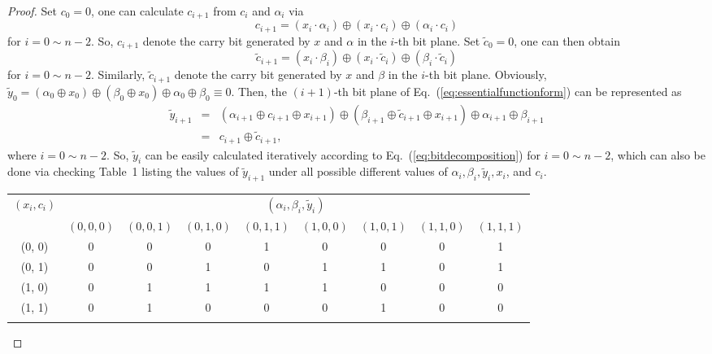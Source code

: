 \documentclass{ws-ijbc}
\begin{document}
\begin{proof}
Set $c_0=0$, one can calculate
$c_{i+1}$ from $c_i$ and $\alpha_i$ via
\begin{equation}
c_{i+1}=(x_i\cdot \alpha_i) \oplus (x_i\cdot c_i) \oplus (\alpha_i\cdot c_i)
\label{eq:getcarrybit}
\end{equation}
for $i=0\sim n-2$. So, $c_{i+1}$ denote the carry bit generated by $x$ and $\alpha$ in the $i$-th bit plane. Set $\tilde{c}_0=0$, one can then obtain
\begin{equation*}
\tilde{c}_{i+1}=(x_i\cdot \beta_i) \oplus (x_i\cdot \tilde{c}_i) \oplus (\beta_i\cdot \tilde{c}_i)
\end{equation*}
for $i=0\sim n-2$. Similarly, $\tilde{c}_{i+1}$ denote the carry bit generated by $x$ and $\beta$ in the $i$-th bit plane. Obviously, $\tilde{y}_0=(\alpha_0\oplus x_0)\oplus(\beta_0\oplus x_0)\oplus \alpha_0\oplus \beta_0\equiv 0$.
Then, the $(i+1)$-th bit plane of Eq.~(\ref{eq:essentialfunctionform}) can be represented as
\begin{eqnarray*}
\tilde{y}_{i+1} & = & (\alpha_{i+1}\oplus c_{i+1}\oplus x_{i+1})\oplus (\beta_{i+1}\oplus\tilde{c}_{i+1}\oplus x_{i+1})\oplus \alpha_{i+1}\oplus \beta_{i+1}\\
                & = & c_{i+1}\oplus \tilde{c}_{i+1},
\end{eqnarray*}
where $i=0\sim n-2$. So, $\tilde{y}_i$ can be easily calculated iteratively according to Eq.~(\ref{eq:bitdecomposition}) for $i=0\sim n-2$, which
can also be done via checking Table~1 listing the values of $\tilde{y}_{i+1}$ under all possible different values of $\alpha_i, \beta_i,\tilde{y}_{i}, x_i$, and $c_i$.
\begin{table}[htbp]
{\begin{tabular}{*{8}{c}c}
\toprule
\multirow{2}{0.3in}{$(x_i, c_i)$}     & \multicolumn{8}{c}{$(\alpha_i, \beta_i,\tilde{y}_{i} )$} \\
\cline{2-9} & $(0,0,0)$ & $(0,0,1)$ & $(0,1,0)$ & $(0,1,1)$ & $(1,0,0)$ & $(1,0,1)$ & $(1,1,0)$ & $(1,1,1)$\\\hline
(0, 0)      &     0     &   0       &   0       &   1       &   0       &   0       &       0   &   1    \\
(0, 1)      &     0     &   0       &   1       &   0       &   1       &   1       &       0   &   1    \\  \hline
(1, 0)      &     0     &   1       &   1       &   1       &   1       &   0       &       0   &   0    \\
(1, 1)      &     0     &   1       &   0       &   0       &   0       &   1       &       0   &   0    \\ [-4pt]
\botrule
\end{tabular}}
\label{table:carrybits}
\end{table}
\end{proof}
\end{document}
